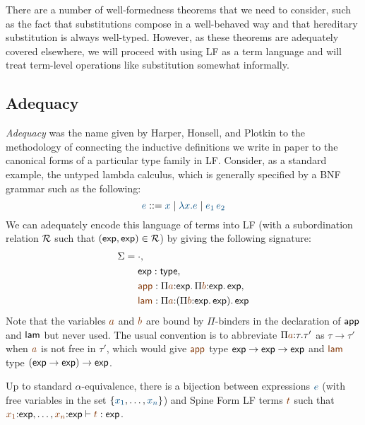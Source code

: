 There are a number of well-formedness theorems that we need to
consider, such as the fact that substitutions compose in a
well-behaved way and that hereditary substitution is always
well-typed.  However, as these theorems are adequately covered
elsewhere, we will proceed with using LF as a term language and will 
treat term-level operations like substitution somewhat informally.

\subsection{Adequacy}
\label{sec:lf-adequacy}

{\it Adequacy} was the name given by Harper, Honsell, and Plotkin to the
methodology of connecting the inductive definitions we write in paper
to the canonical forms of a particular type family in LF. Consider,
as a standard example, the untyped lambda calculus, which is generally
specified by a BNF grammar such as the following:
\[
\obj{e} ::= \obj{x} \mid \obj{\lambda x.e} \mid \obj{e_1\,e_2}
\]
We can adequately encode this language of terms into LF (with a
subordination relation $\mathcal R$ such that $({\sf exp}, {\sf
  exp}) \in \mathcal R$) by giving the following signature:
\begin{align*}
\Sigma & = \cdot, 
\\
 & ~\quad {\sf exp} : {\sf type}, 
\\
 & ~\quad \lf{\sf app} : 
     \lfpi{a}{{\sf exp}}{\,\lfpi{b}{\sf exp}{\,\sf exp}},
\\
 & ~\quad \lf{\sf lam} : 
     \lfpi{a}{(\lfpi{b}{\sf exp}{\,\sf exp})}{\,\sf exp}
\end{align*}
Note that the variables $\lf{a}$ and $\lf{b}$ are bound by
$\Pi$-binders in the declaration of ${\sf app}$ and ${\sf lam}$ but
never used. The usual convention is to abbreviate
$\lfpi{a}{\tau}{\tau'}$ as $\tau \rightarrow \tau'$ when $\lf{a}$ is
not free in $\tau'$, which would give $\lf{\sf app}$ type ${\sf exp}
\rightarrow {\sf exp} \rightarrow {\sf exp}$ and $\lf{\sf lam}$ type
$({\sf exp} \rightarrow {\sf exp}) \rightarrow {\sf exp}$.

\bigskip
\begin{theorem}
  Up to standard $\alpha$-equivalence, there is a bijection between
  expressions $\obj{e}$ (with free variables in the set
  $\{\obj{x_1},\ldots,\obj{x_n}\}$) and Spine Form LF terms $\lf{t}$ such
  that $\lf{x_1}{:}\mathsf{exp}, \ldots, \lf{x_n}{:}\mathsf{exp} \vdash
  \lf{t} : \mathsf{exp}$. 
\end{theorem}


